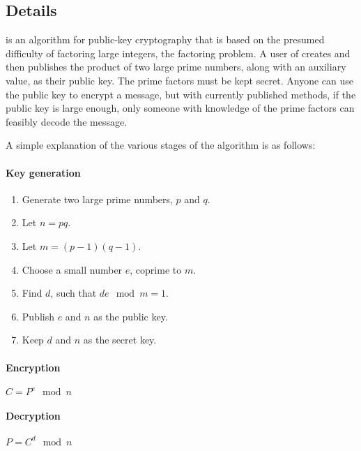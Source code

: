 \documentclass[a4paper,11pt]{article}
\begin{document}
\subsection{Details}
 is an algorithm for public-key cryptography that is based on the
presumed difficulty of factoring large integers, the factoring problem. A user
of  creates and then publishes the product of two large prime
numbers, along with an auxiliary value, as their public key. The prime factors
must be kept secret. Anyone can use the public key to encrypt a message, but
with currently published methods, if the public key is large enough, only
someone with knowledge of the prime factors can feasibly decode the message.

A simple explanation of the various stages of the  algorithm is
as follows:

\paragraph{Key generation}
\begin{enumerate}
\item Generate two large prime numbers, $p$ and $q$.
\item Let $n = pq$.
\item Let $m = (p-1)(q-1)$.
\item Choose a small number $e$, coprime to $m$.
\item Find $d$, such that $de \mod m = 1$.
\item Publish $e$ and $n$ as the public key.
\item Keep $d$ and $n$ as the secret key.
\end{enumerate}

\paragraph{Encryption}
\begin{math}
C = P^{e} \mod n
\end{math}

\paragraph{Decryption}
\begin{math}
P = C^{d} \mod n
\end{math}
\end{document}
